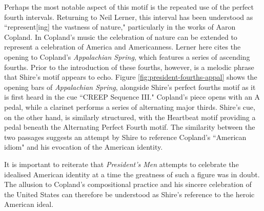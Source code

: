 Perhaps the most notable aspect of this motif is the repeated use of the perfect fourth intervals.
Returning to Neil Lerner, this interval has been understood as ``represent[ing] the vastness of nature," particularly in the works of Aaron Copland.\autocites[][503]{lerner_coplands_2001}
In Copland's music the celebration of nature can be extended to represent a celebration of America and Americanness.
Lerner here cites the opening to Copland's \textit{Appalachian Spring}, which features a series of ascending fourths.
Prior to the introduction of these fourths, however, is a melodic phrase that Shire's motif appears to echo.
Figure \ref{fig:president-fourths-appal} shows the opening bars of \textit{Appalachian Spring}, alongside Shire's perfect fourths motif as it is first heard in the cue ``CREEP Sequence III."
Copland's piece opens with an A pedal, while a clarinet performs a series of alternating major thirds.
Shire's cue, on the other hand, is similarly structured, with the Heartbeat motif providing a pedal beneath the Alternating Perfect Fourth motif.
The similarity between the two passages suggests an attempt by Shire to reference Copland's ``American idiom" and his evocation of the American identity.\autocites[This phrase is taken from W. H. Mellers' discussion of ``American music," wherein he identifies several compositional practices that make up the ``American idiom." One of the key traits he identifies, and the most relevant for my discussion here is the ``feeling of vastness, enormous airiness and emptiness of space which probably derives from America's physical immensity and which is communicated through the music partly by the dominance of fourths and natural sevenths."][370-371]{mellers_american_1943}

It is important to reiterate that \textit{President's Men} attempts to celebrate the idealised American identity at a time the greatness of such a figure was in doubt.
The allusion to Copland's compositional practice and his sincere celebration of the United States can therefore be understood as Shire's reference to the heroic American ideal.



